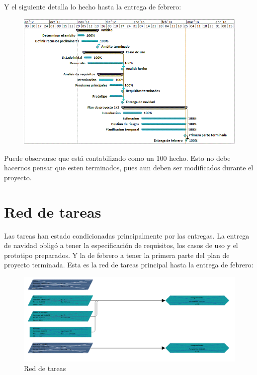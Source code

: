 \documentclass[spanish,a4paper,11pt, twoside]{report}	%
\begin{document}
	Y el siguiente detalla lo hecho hasta la entrega de febrero:

	\begin{figure}[!h]
	\centering
	\includegraphics[scale=0.8]{GraficoGanttDetallado.png}
	\end{figure}

	Puede observarse que está contabilizado como un 100 hecho. Esto no debe hacernos pensar que esten terminados,
	pues aun deben ser modificados durante el proyecto.

	\newpage

	\section{Red de tareas}

	Las tareas han estado condicionadas principalmente por las entregas. La entrega de navidad obligó a tener la especificación de requisitos,  los casos de uso y el prototipo preparados.
	 Y la de febrero a tener la primera parte del plan de proyecto terminada. Esta es la red de tareas principal hasta la entrega de febrero:

	\begin{figure}[!h]
	\centering
	\includegraphics[scale=0.56]{RedTareas.png}
	\caption{Red de tareas}
	\end{figure}
\end{document}
